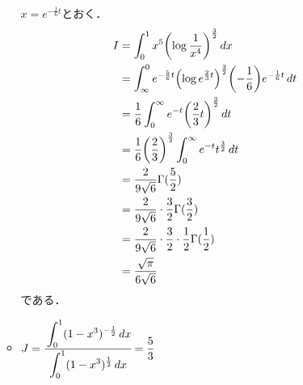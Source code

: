 \begin{enumerate}[(1)]
\begin{itemize}
        $\displaystyle x=e^{-\frac{1}{6}t}$とおく．
        \begin{align}
            I
            &=\int^1_0 x^5 \qty(\log \frac{1}{x^4})^\frac{3}{2} \dd{x}\\
            &=\int^0_{\infty} e^{-\frac{5}{6}t} \qty(\log e^{\frac{2}{3}t})^\frac{3}{2} \qty(-\frac{1}{6})e^{-\frac{1}{6}t}\dd{t}\\
            &=\frac{1}{6}\int^\infty_0 e^{-t} \qty(\frac{2}{3}t)^\frac{3}{2}\dd{t}\\
            &=\frac{1}{6}\qty(\frac{2}{3})^\frac{3}{2}\int^\infty_0 e^{-t} t^\frac{3}{2}\dd{t}\\
            &=\frac{2}{9\sqrt{6}}\Gamma(\frac{5}{2})\\
            &=\frac{2}{9\sqrt{6}} \cdot \frac{3}{2} \Gamma(\frac{3}{2})\\
            &=\frac{2}{9\sqrt{6}} \cdot \frac{3}{2} \cdot \frac{1}{2} \Gamma(\frac{1}{2})\\
            &=\frac{\sqrt{\pi}}{6\sqrt{6}} \\
        \end{align}
        である．

        \item $J=\cfrac{\displaystyle \int^1_0 (1-x^3)^{-\frac{1}{2}} \dd{x}}{\displaystyle \int^1_0 (1-x^3)^{\frac{1}{2}} \dd{x}} = \dfrac{5}{3}$
        

\end{itemize}
\end{enumerate}
